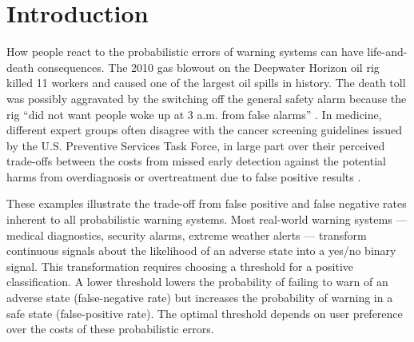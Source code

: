 \documentclass[12pt,a4paper]{article}
\begin{document}
\section{Introduction}

How people react to the probabilistic errors of warning systems can have life-and-death consequences. The 2010 gas blowout on the Deepwater Horizon oil rig killed 11 workers and caused one of the largest oil spills in history. The death toll was possibly aggravated by the switching off the general safety alarm because the rig ``did not want people woke up at 3 a.m. from false alarms'' \citep{brown_oil_2010}. In medicine, different expert groups often disagree with the cancer screening guidelines issued by the U.S. Preventive Services Task Force, in large part over their perceived trade-offs between the costs from missed early detection against the potential harms from overdiagnosis or overtreatment due to false positive results \citep{rabin_reversal_2024}.

These examples illustrate the trade-off from false positive and false negative rates inherent to all probabilistic warning systems.  
Most real-world warning systems --- medical diagnostics, security alarms, extreme weather alerts --- transform continuous signals about the likelihood of an adverse state into a yes/no binary signal. This transformation requires choosing a threshold for a positive classification. A lower threshold lowers the probability of failing to warn of an adverse state (false-negative rate) but increases the probability of warning in a safe state (false-positive rate). The optimal threshold depends on user preference over the costs of these probabilistic errors.

\end{document}
